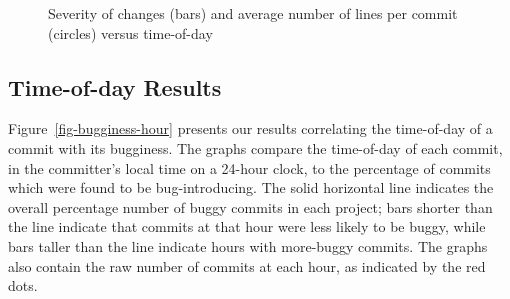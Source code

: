 \begin{figure}[tbh]
\centering
{}
\caption{\label{fig-severity-hour}Severity of changes (bars) and average number of lines per commit (circles) versus time-of-day}
\end{figure}


\subsection{Time-of-day Results} 
\label{sec-time-of-day}
Figure~\ref{fig-bugginess-hour} 
presents our results correlating the time-of-day of a commit
with its bugginess.  
The graphs compare the time-of-day of each
commit, in the committer's local time on a 24-hour clock, to the
percentage of commits which were found to be bug-introducing. The
solid horizontal line indicates the overall percentage number of buggy commits in
each project; bars shorter than the line indicate that commits at that
hour were less likely to be buggy, while bars taller than the line
indicate hours with more-buggy commits. The graphs also contain the
raw number of commits at each hour, as indicated by the red dots.

